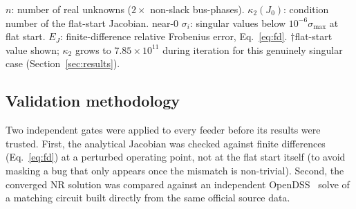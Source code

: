 \documentclass[conference]{IEEEtran}
\begin{document}
\begin{table}[t]
\centering
\caption{Reconstructed feeders: size, flat-start conditioning, and Jacobian validation.}
\label{tab:feeders}

\vspace{2pt}
\footnotesize $n$: number of real unknowns ($2\times$ non-slack bus-phases).
$\kappa_2(J_0)$: condition number of the flat-start Jacobian. near-0
$\sigma_i$: singular values below $10^{-6}\sigma_{\max}$ at flat start.
$E_J$: finite-difference relative Frobenius error,
Eq.~\eqref{eq:fd}. $\dagger$flat-start value shown; $\kappa_2$ grows to
$7.85\times10^{11}$ during iteration for this genuinely singular case
(Section~\ref{sec:results}).
\end{table}

\subsection{Validation methodology}
\label{sec:validation}
Two independent gates were applied to every feeder before its results were
trusted. First, the analytical Jacobian was checked against finite
differences (Eq.~\eqref{eq:fd}) at a perturbed operating point, not at the
flat start itself (to avoid masking a bug that only appears once the
mismatch is non-trivial). Second, the converged NR solution was compared
against an independent OpenDSS~\cite{opendss} solve of a matching circuit
built directly from the same official source data.
\end{document}
